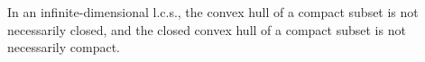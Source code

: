 In an infinite-dimensional l.c.s., the convex hull of a compact subset is not necessarily closed, and the closed convex hull of a compact subset is not necessarily compact.
